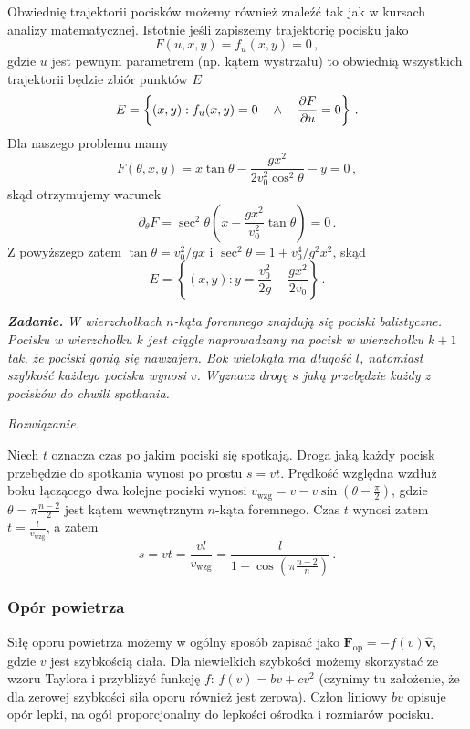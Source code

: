 \documentclass[../main.tex]{subfiles}
\begin{document}
Obwiednię trajektorii pocisków możemy również znaleźć tak jak w kursach analizy matematycznej.
Istotnie jeśli zapiszemy trajektorię pocisku jako
\begin{equation*}
    F(u,x,y)=f_u(x,y)=0\,,
\end{equation*}
gdzie \(u\) jest pewnym parametrem (np. kątem wystrzału) to obwiednią wszystkich trajektorii będzie
zbiór punktów \(E\)
\begin{equation*}
    E=\left\{(x,y):f_u(x,y)=0\quad\land\quad \pdv{F}{u}=0\right\}\,.
\end{equation*}
Dla naszego problemu mamy
\begin{equation*}
    F(\theta,x,y)=x\tan\theta-\frac{gx^2}{2v_0^2\cos^2\theta}-y=0\,,
\end{equation*}
skąd otrzymujemy warunek
\begin{equation*}
    \partial_\theta F=\sec^2\theta\left(x-\frac{gx^2}{v_0^2}\tan\theta\right)=0\,.
\end{equation*}
Z powyższego zatem \(\tan\theta=v_0^2/gx\) i \(\sec^2\theta=1+v_0^4/g^2x^2\), skąd
\begin{equation*}
    E=\left\{(x,y): y=\frac{v_0^2}{2g}-\frac{gx^2}{2v_0}\right\}\,.
\end{equation*}
\medskip

{\textbf{\textit{Zadanie.}}}
\textit{W wierzchołkach \(n\)-kąta foremnego znajdują się pociski balistyczne. Pocisku w wierzchołku \(k\) jest ciągle naprowadzany na pocisk w wierzchołku \(k+1\) tak, że pociski gonią się nawzajem. Bok wielokąta ma długość \(l\), natomiast szybkość każdego pocisku wynosi \(v\). Wyznacz drogę \(s\) jaką przebędzie każdy z pocisków do chwili spotkania.}
\medskip

\textit{Rozwiązanie. \medskip}

Niech \(t\) oznacza czas po jakim pociski się spotkają. Droga jaką każdy pocisk przebędzie do
spotkania wynosi po prostu \(s=vt\). Prędkość względna wzdłuż boku łączącego dwa kolejne pociski
wynosi \(v_\text{wzg}=v-v\sin\left(\theta-\frac{\pi}{2}\right)\), gdzie \(\theta=\pi\frac{n-2}{2}\)
jest kątem wewnętrznym \(n\)-kąta foremnego. Czas \(t\) wynosi zatem \(t=\frac{l}{v_\text{wzg}}\), a
zatem
\begin{equation*}
    s=vt=\frac{vl}{v_\text{wzg}}=\frac{l}{1+\cos\left(\pi\frac{n-2}{n}\right)}\,.
\end{equation*}
\subsubsection{Opór powietrza}
Siłę oporu powietrza możemy w ogólny sposób zapisać jako \(\mathbf{F}_\text{op}=-f(v)\mathbf{\hat
v}\), gdzie \(v\) jest szybkością ciała. Dla niewielkich szybkości możemy skorzystać ze wzoru
Taylora i przybliżyć funkcję \(f\): \(f(v)=bv+cv^2\) (czynimy tu założenie, że dla zerowej szybkości
siła oporu również jest zerowa). Człon liniowy \(bv\) opisuje opór lepki, na ogół proporcjonalny do
lepkości ośrodka i rozmiarów pocisku.
\end{document}
